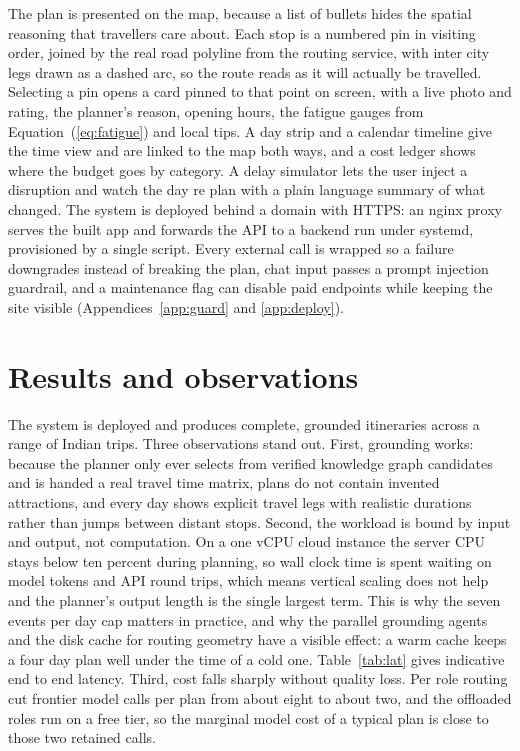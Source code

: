 \documentclass{ecai}
\begin{document}
The plan is presented on the map, because a list of bullets hides the spatial
reasoning that travellers care about. Each stop is a numbered pin in visiting
order, joined by the real road polyline from the routing service, with
inter city legs drawn as a dashed arc, so the route reads as it will actually
be travelled. Selecting a pin opens a card pinned to that point on screen, with
a live photo and rating, the planner's reason, opening hours, the fatigue
gauges from Equation~(\ref{eq:fatigue}) and local tips. A day strip and a
calendar timeline give the time view and are linked to the map both ways, and a
cost ledger shows where the budget goes by category. A delay simulator lets the
user inject a disruption and watch the day re plan with a plain language summary
of what changed. The system is deployed behind a domain with HTTPS: an nginx
proxy serves the built app and forwards the API to a backend run under systemd,
provisioned by a single script. Every external call is wrapped so a failure
downgrades instead of breaking the plan, chat input passes a prompt injection
guardrail, and a maintenance flag can disable paid endpoints while keeping the
site visible (Appendices~\ref{app:guard} and \ref{app:deploy}).

\section{Results and observations}
\label{sec:cost}

The system is deployed and produces complete, grounded itineraries across a
range of Indian trips. Three observations stand out. First, grounding works:
because the planner only ever selects from verified knowledge graph candidates
and is handed a real travel time matrix, plans do not contain invented
attractions, and every day shows explicit travel legs with realistic durations
rather than jumps between distant stops. Second, the workload is bound by input
and output, not computation. On a one vCPU cloud instance the server CPU stays
below ten percent during planning, so wall clock time is spent waiting on model
tokens and API round trips, which means vertical scaling does not help and the
planner's output length is the single largest term. This is why the seven
events per day cap matters in practice, and why the parallel grounding agents
and the disk cache for routing geometry have a visible effect: a warm cache
keeps a four day plan well under the time of a cold one. Table~\ref{tab:lat}
gives indicative end to end latency. Third, cost falls sharply without quality
loss. Per role routing cut frontier model calls per plan from about eight to
about two, and the offloaded roles run on a free tier, so the marginal model
cost of a typical plan is close to those two retained calls.
\end{document}
